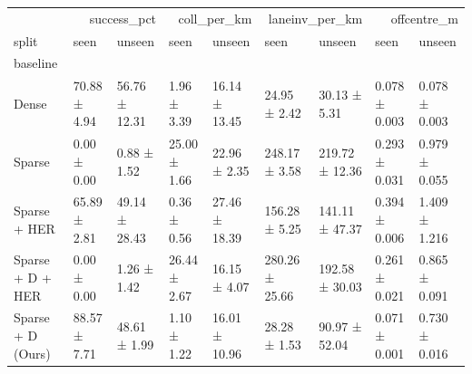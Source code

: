 \begin{tabular}{lllllllll}
\toprule
 & \multicolumn{2}{r}{success_pct} & \multicolumn{2}{r}{coll_per_km} & \multicolumn{2}{r}{laneinv_per_km} & \multicolumn{2}{r}{offcentre_m} \\
split & seen & unseen & seen & unseen & seen & unseen & seen & unseen \\
baseline &  &  &  &  &  &  &  &  \\
\midrule
Dense & 70.88 ± 4.94 & 56.76 ± 12.31 & 1.96 ± 3.39 & 16.14 ± 13.45 & 24.95 ± 2.42 & 30.13 ± 5.31 & 0.078 ± 0.003 & 0.078 ± 0.003 \\
Sparse & 0.00 ± 0.00 & 0.88 ± 1.52 & 25.00 ± 1.66 & 22.96 ± 2.35 & 248.17 ± 3.58 & 219.72 ± 12.36 & 0.293 ± 0.031 & 0.979 ± 0.055 \\
Sparse + HER & 65.89 ± 2.81 & 49.14 ± 28.43 & 0.36 ± 0.56 & 27.46 ± 18.39 & 156.28 ± 5.25 & 141.11 ± 47.37 & 0.394 ± 0.006 & 1.409 ± 1.216 \\
Sparse + D + HER & 0.00 ± 0.00 & 1.26 ± 1.42 & 26.44 ± 2.67 & 16.15 ± 4.07 & 280.26 ± 25.66 & 192.58 ± 30.03 & 0.261 ± 0.021 & 0.865 ± 0.091 \\
Sparse + D (Ours) & 88.57 ± 7.71 & 48.61 ± 1.99 & 1.10 ± 1.22 & 16.01 ± 10.96 & 28.28 ± 1.53 & 90.97 ± 52.04 & 0.071 ± 0.001 & 0.730 ± 0.016 \\
\bottomrule
\end{tabular}
